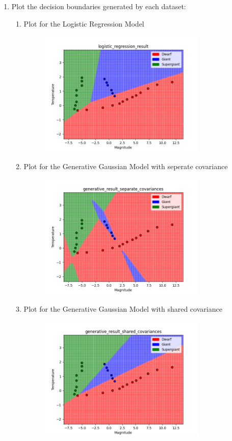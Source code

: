\documentclass[submit]{harvardml}
\begin{document}
\begin{enumerate}
    \item Plot the decision boundaries generated by each dataset:
    \begin{enumerate}
        \item Plot for the Logistic Regression Model
        \begin{figure}[H]
            \includegraphics[width=8cm]{hw2/P3_plots/logistic_regression_result.png}
            \centering
        \end{figure}
        \item Plot for the Generative Gaussian Model with seperate covariance
        \begin{figure}[H]
            \includegraphics[width=8cm]{hw2/P3_plots/generative_result_separate_covariances.png}
            \centering
        \end{figure}
        \item Plot for the Generative Gaussian Model with shared covariance
        \begin{figure}[H]
            \includegraphics[width=8cm]{hw2/P3_plots/generative_result_shared_covariances.png}

\end{figure}
\end{enumerate}
\end{enumerate}
\end{document}
